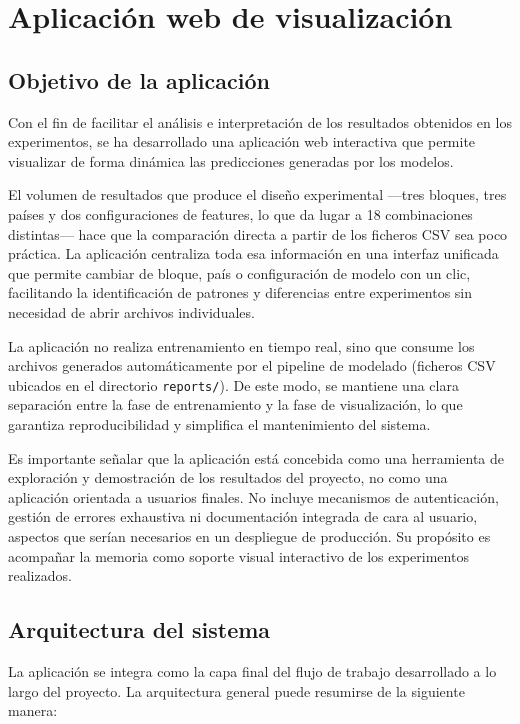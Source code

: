 \chapter{Aplicación web de visualización}
\label{app}

\section{Objetivo de la aplicación}

Con el fin de facilitar el análisis e interpretación de los resultados obtenidos en los experimentos, se ha desarrollado una aplicación web interactiva que permite visualizar de forma dinámica las predicciones generadas por los modelos.

El volumen de resultados que produce el diseño experimental ---tres bloques, tres países y dos configuraciones de features, lo que da lugar a 18 combinaciones distintas--- hace que la comparación directa a partir de los ficheros CSV sea poco práctica. La aplicación centraliza toda esa información en una interfaz unificada que permite cambiar de bloque, país o configuración de modelo con un clic, facilitando la identificación de patrones y diferencias entre experimentos sin necesidad de abrir archivos individuales.

La aplicación no realiza entrenamiento en tiempo real, sino que consume los archivos generados automáticamente por el pipeline de modelado (ficheros CSV ubicados en el directorio \texttt{reports/}). De este modo, se mantiene una clara separación entre la fase de entrenamiento y la fase de visualización, lo que garantiza reproducibilidad y simplifica el mantenimiento del sistema.

Es importante señalar que la aplicación está concebida como una herramienta de exploración y demostración de los resultados del proyecto, no como una aplicación orientada a usuarios finales. No incluye mecanismos de autenticación, gestión de errores exhaustiva ni documentación integrada de cara al usuario, aspectos que serían necesarios en un despliegue de producción. Su propósito es acompañar la memoria como soporte visual interactivo de los experimentos realizados.

\section{Arquitectura del sistema}

La aplicación se integra como la capa final del flujo de trabajo desarrollado a lo largo del proyecto. La arquitectura general puede resumirse de la siguiente manera:

